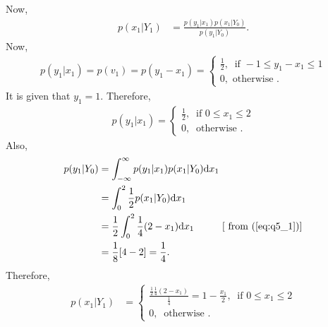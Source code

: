 Now,
\begin{align*}
	p(x_1|Y_1) &= \frac{p(y_1|x_1)p(x_1|Y_0)}{p(y_1|Y_0)}.
\end{align*}
Now,
\begin{align*}
	p(y_1|x_1) = p(v_1) = p(y_1-x_1) = \begin{cases}
		\frac{1}{2},\ \text{ if }-1\leq y_1-x_1\leq 1\\
		0, \text{ otherwise }.
	\end{cases}
\end{align*}
It is given that $y_1=1$. Therefore,
\begin{align*}
	p(y_1|x_1) = \begin{cases}
		\frac{1}{2},\ \text{ if }0\leq x_1 \leq 2\\
		0,\ \text{ otherwise }.
	\end{cases}
\end{align*}
Also,
\begin{align*}
	p(y_1|Y_0) &= \int_{-\infty}^{\infty}p(y_1|x_1)p(x_1|Y_0)\text{d}x_1\\
	&= \int_{0}^{2}\frac{1}{2}p(x_1|Y_0)\text{d}x_1\\
	&= \frac{1}{2}\int_{0}^{2}\frac{1}{4}(2-x_1)\text{d}x_1 \hspace*{1cm}[\text{ from }(\ref{eq:q5_1})]\\
	&= \frac{1}{8}[4-2] = \frac{1}{4}.
\end{align*}
Therefore,
\begin{align*}
	p(x_1|Y_1) &= \begin{cases}
		\frac{\frac{1}{2}\frac{1}{4}(2-x_1)}{\frac{1}{4}} = 1-\frac{x_1}{2},\ \text{ if }0\leq x_1 \leq 2\\
		0,\ \text{ otherwise }.
	\end{cases}
\end{align*}
